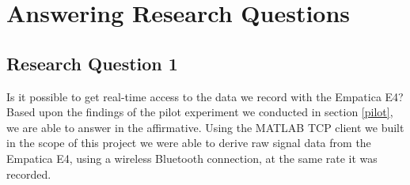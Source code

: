 \section{Answering Research Questions}
\subsection{Research Question 1} 
Is it possible to get real-time access to the data we record with the Empatica E4?\\[10pt]
Based upon the findings of the pilot experiment we conducted in section \ref{pilot}, we are able to answer in the affirmative. Using the MATLAB TCP client we built in the scope of this project we were able to derive raw signal data from the Empatica E4, using a wireless Bluetooth connection, at the same rate it was recorded.


